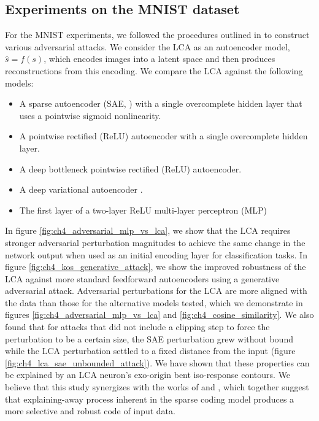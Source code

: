 
\subsection{Experiments on the MNIST dataset}\label{sec:ch4_mnist_experiments}
For the MNIST experiments, we followed the procedures outlined in \parencite{kos2018adversarial, kurakin2016adversarial, carlini2017towards} to construct various adversarial attacks. We consider the LCA as an autoencoder model, $\hat{s}=f(s)$, which encodes images into a latent space and then produces reconstructions from this encoding. We compare the LCA against the following models:

\begin{itemize}
  \item A sparse autoencoder (SAE, \cite{ng2011sparse}) with a single overcomplete hidden layer that uses a pointwise sigmoid nonlinearity.
  \item A pointwise rectified (ReLU) \parencite{hahnloser2000digital, nair2010rectified} autoencoder with a single overcomplete hidden layer.
  \item A deep bottleneck pointwise rectified (ReLU) autoencoder.
  \item A deep variational autoencoder \parencite{kingma2013auto}.
  \item The first layer of a two-layer ReLU multi-layer perceptron (MLP)
\end{itemize}

In figure \ref{fig:ch4_adversarial_mlp_vs_lca}, we show that the LCA requires stronger adversarial perturbation magnitudes to achieve the same change in the network output when used as an initial encoding layer for classification tasks. In figure \ref{fig:ch4_kos_generative_attack}, we show the improved robustness of the LCA against more standard feedforward autoencoders using a generative adversarial attack. Adversarial perturbations for the LCA are more aligned with the data than those for the alternative models tested, which we demonstrate in figures \ref{fig:ch4_adversarial_mlp_vs_lca} and \ref{fig:ch4_cosine_similarity}. We also found that for attacks that did not include a clipping step to force the perturbation to be a certain size, the SAE perturbation grew without bound while the LCA perturbation settled to a fixed distance from the input (figure \ref{fig:ch4_lca_sae_unbounded_attack}). We have shown that these properties can be explained by an LCA neuron's exo-origin bent iso-response contours. We believe that this study synergizes with the works of \parencite{zhu2013visual} and \parencite{golden2016conjectures}, which together suggest that explaining-away process inherent in the sparse coding model produces a more selective and robust code of input data.


